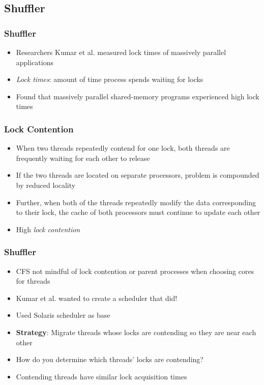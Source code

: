 \documentclass{beamer}
\newcommand{\linespace}{\vskip 0.25cm}
\begin{document}
\subsection{Shuffler}
\begin{frame}
\frametitle{Shuffler}

\begin{itemize}


\item Researchers Kumar et al. measured lock times of massively parallel applications
\item \emph{Lock times}: amount of time process spends waiting for locks

\linespace

\item Found that massively parallel shared-memory programs experienced high lock times


\end{itemize}

\end{frame}

\begin{frame}
\frametitle{Lock Contention}

\begin{itemize}

\item When two threads repeatedly contend for one lock, both threads are frequently waiting for each other to release
\linespace
\item If the two threads are located on separate processors, problem is compounded by reduced locality
\linespace
\item Further, when both of the threads repeatedly modify the data corresponding to their lock, the cache of both processors must continue to update each other
\linespace
\item High \emph{lock contention}

\end{itemize}

\end{frame}


\begin{frame}
\frametitle{Shuffler}
\begin{itemize}
	\item CFS not mindful of lock contention or parent processes when choosing cores for threads
	
	\item Kumar et al. wanted to create a scheduler that did!
	\item Used Solaris scheduler as base
	\linespace
	\item \textbf{Strategy}: Migrate threads whose locks are contending so they are near each other
	\linespace
	
	\item How do you determine which threads' locks are contending?
	\item Contending threads have similar lock acquisition times
	
\end{itemize}
\end{frame}
\end{document}
